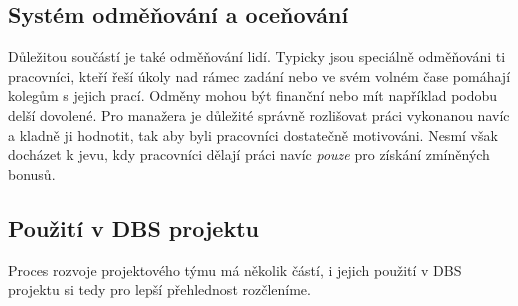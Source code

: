 \subsection{Systém odměňování a oceňování}
Důležitou součástí je také odměňování lidí. Typicky jsou speciálně odměňováni ti pracovníci, kteří řeší úkoly nad rámec zadání nebo ve svém volném čase pomáhají kolegům s jejich prací. Odměny mohou být finanční nebo mít například podobu delší dovolené. Pro manažera je důležité správně rozlišovat práci vykonanou navíc a kladně ji hodnotit, tak aby byli pracovníci dostatečně motivováni. Nesmí však docházet k jevu, kdy pracovníci dělají práci navíc \emph{pouze} pro získání zmíněných bonusů.

\subsection{Použití v DBS projektu}
Proces rozvoje projektového týmu má několik částí, i jejich použití v DBS projektu si tedy pro lepší přehlednost rozčleníme.

